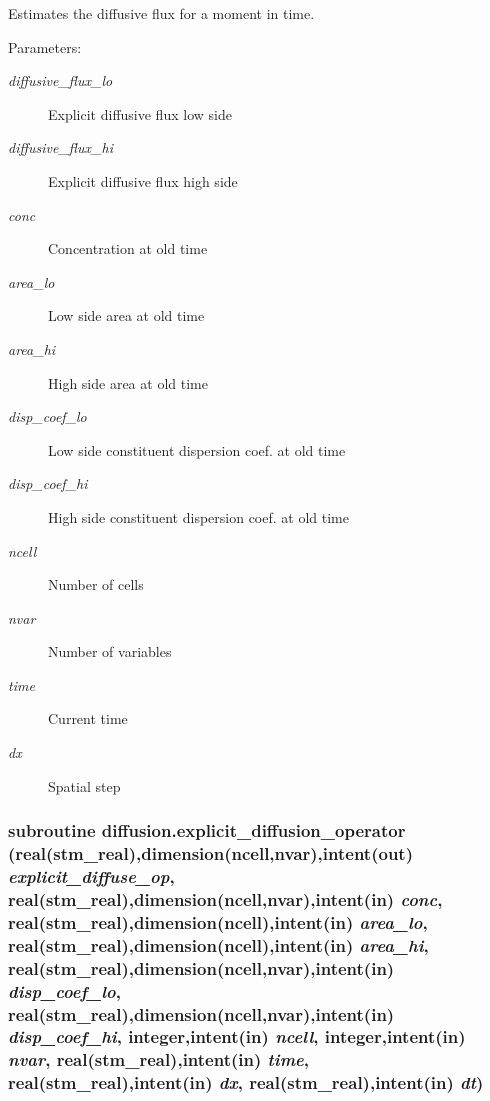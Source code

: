 Estimates the diffusive flux for a moment in time. 

\begin{Desc}
\item[Parameters:]
\begin{description}
\item[{\em diffusive\_\-flux\_\-lo}]Explicit diffusive flux low side\item[{\em diffusive\_\-flux\_\-hi}]Explicit diffusive flux high side\item[{\em conc}]Concentration at old time\item[{\em area\_\-lo}]Low side area at old time\item[{\em area\_\-hi}]High side area at old time \item[{\em disp\_\-coef\_\-lo}]Low side constituent dispersion coef. at old time\item[{\em disp\_\-coef\_\-hi}]High side constituent dispersion coef. at old time\item[{\em ncell}]Number of cells\item[{\em nvar}]Number of variables\item[{\em time}]Current time\item[{\em dx}]Spatial step \end{description}
\end{Desc}
\hypertarget{a00056_e421e32336560a2a59008f31316260db}{
\subsubsection[{explicit\_\-diffusion\_\-operator}]{\setlength{\rightskip}{0pt plus 5cm}subroutine diffusion.explicit\_\-diffusion\_\-operator (real(stm\_\-real),dimension(ncell,nvar),intent(out) {\em explicit\_\-diffuse\_\-op}, \/  real(stm\_\-real),dimension(ncell,nvar),intent(in) {\em conc}, \/  real(stm\_\-real),dimension(ncell),intent(in) {\em area\_\-lo}, \/  real(stm\_\-real),dimension(ncell),intent(in) {\em area\_\-hi}, \/  real(stm\_\-real),dimension(ncell,nvar),intent(in) {\em disp\_\-coef\_\-lo}, \/  real(stm\_\-real),dimension(ncell,nvar),intent(in) {\em disp\_\-coef\_\-hi}, \/  integer,intent(in) {\em ncell}, \/  integer,intent(in) {\em nvar}, \/  real(stm\_\-real),intent(in) {\em time}, \/  real(stm\_\-real),intent(in) {\em dx}, \/  real(stm\_\-real),intent(in) {\em dt})}}
\label{a00056_e421e32336560a2a59008f31316260db}


